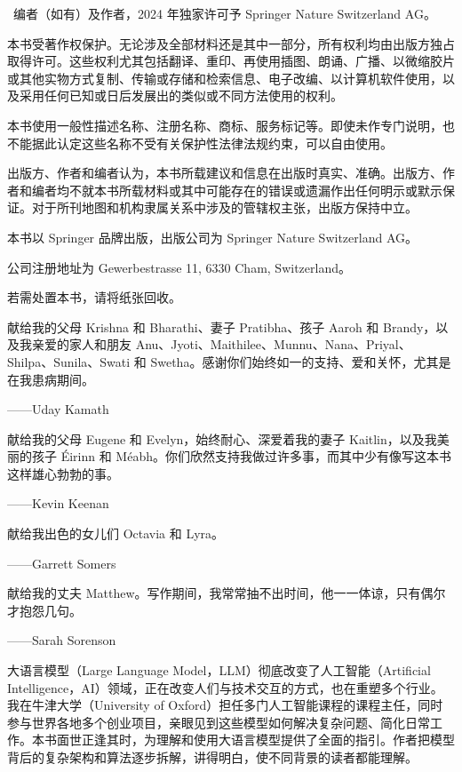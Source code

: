 \textcopyright\ 编者（如有）及作者，2024 年独家许可予 Springer Nature Switzerland AG。

本书受著作权保护。无论涉及全部材料还是其中一部分，所有权利均由出版方独占取得许可。这些权利尤其包括翻译、重印、再使用插图、朗诵、广播、以微缩胶片或其他实物方式复制、传输或存储和检索信息、电子改编、以计算机软件使用，以及采用任何已知或日后发展出的类似或不同方法使用的权利。

本书使用一般性描述名称、注册名称、商标、服务标记等。即使未作专门说明，也不能据此认定这些名称不受有关保护性法律法规约束，可以自由使用。

出版方、作者和编者认为，本书所载建议和信息在出版时真实、准确。出版方、作者和编者均不就本书所载材料或其中可能存在的错误或遗漏作出任何明示或默示保证。对于所刊地图和机构隶属关系中涉及的管辖权主张，出版方保持中立。\par\smallskip

本书以 Springer 品牌出版，出版公司为 Springer Nature Switzerland AG。\par
公司注册地址为 Gewerbestrasse 11, 6330 Cham, Switzerland。\par\smallskip
若需处置本书，请将纸张回收。
\endgroup
\clearpage

\thispagestyle{empty}
\vspace*{28mm}
\begin{flushright}
献给我的父母 Krishna 和 Bharathi、妻子 Pratibha、孩子 Aaroh 和 Brandy，以及我亲爱的家人和朋友 Anu、Jyoti、Maithilee、Munnu、Nana、Priyal、Shilpa、Sunila、Swati 和 Swetha。感谢你们始终如一的支持、爱和关怀，尤其是在我患病期间。\par
——Uday Kamath\par\bigskip

献给我的父母 Eugene 和 Evelyn，始终耐心、深爱着我的妻子 Kaitlin，以及我美丽的孩子 Éirinn 和 Méabh。你们欣然支持我做过许多事，而其中少有像写这本书这样雄心勃勃的事。\par
——Kevin Keenan\par\bigskip

献给我出色的女儿们 Octavia 和 Lyra。\par
——Garrett Somers\par\bigskip

献给我的丈夫 Matthew。写作期间，我常常抽不出时间，他一一体谅，只有偶尔才抱怨几句。\par
——Sarah Sorenson
\end{flushright}

大语言模型（Large Language Model，LLM）彻底改变了人工智能（Artificial Intelligence，AI）领域，正在改变人们与技术交互的方式，也在重塑多个行业。我在牛津大学（University of Oxford）担任多门人工智能课程的课程主任，同时参与世界各地多个创业项目，亲眼见到这些模型如何解决复杂问题、简化日常工作。本书面世正逢其时，为理解和使用大语言模型提供了全面的指引。作者把模型背后的复杂架构和算法逐步拆解，讲得明白，使不同背景的读者都能理解。

